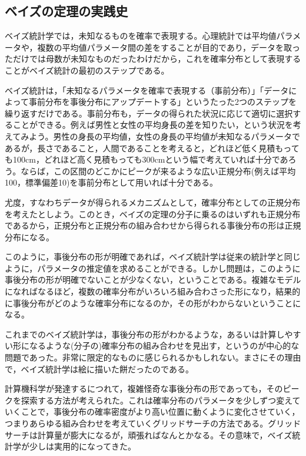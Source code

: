 \documentclass[
  a4paper,
]{ltjsbook}
\begin{document}
\subsection{ベイズの定理の実践史}\label{ux30d9ux30a4ux30baux306eux5b9aux7406ux306eux5b9fux8df5ux53f2}

ベイズ統計学では，未知なるものを確率で表現する。心理統計では平均値パラメータや，複数の平均値パラメータ間の差をすることが目的であり，データを取っただけでは母数が未知なものだったわけだから，これを確率分布として表現することがベイズ統計の最初のステップである。

ベイズ統計は，「未知なるパラメータを確率で表現する（事前分布）」「データによって事前分布を事後分布にアップデートする」というたった2つのステップを繰り返すだけである。事前分布も，データの得られた状況に応じて適切に選択することができる。例えば男性と女性の平均身長の差を知りたい，という状況を考えてみよう。男性の身長の平均値，女性の身長の平均値が未知なるパラメータであるが，長さであること，人間であることを考えると，どれほど低く見積もっても100cm，どれほど高く見積もっても300cmという幅で考えていれば十分であろう。ならば，この区間のどこかにピークが来るような広い正規分布(例えば平均100，標準偏差10)を事前分布として用いれば十分である。

尤度，すなわちデータが得られるメカニズムとして，確率分布としての正規分布を考えたとしよう。このとき，ベイズの定理の分子に乗るのはいずれも正規分布であるから，正規分布と正規分布の組み合わせから得られる事後分布の形は正規分布になる。

このように，事後分布の形が明確であれば，ベイズ統計学は従来の統計学と同じように，パラメータの推定値を求めることができる。しかし問題は，このように事後分布の形が明確でないことが少なくない，ということである。複雑なモデルになればなるほど，複数の確率分布がいろいろ組み合わさった形になり，結果的に事後分布がどのような確率分布になるのか，その形がわからないということになる。

これまでのベイズ統計学は，事後分布の形がわかるような，あるいは計算しやすい形になるような(分子の)確率分布の組み合わせを見出す，というのが中心的な問題であった。非常に限定的なものに感じられるかもしれない。まさにその理由で，ベイズ統計学は絵に描いた餅だったのである。

計算機科学が発達するにつれて，複雑怪奇な事後分布の形であっても，そのピークを探索する方法が考えられた。これは確率分布のパラメータを少しずつ変えていくことで，事後分布の確率密度がより高い位置に動くように変化させていく，つまりあらゆる組み合わせを考えていくグリッドサーチの方法である。グリッドサーチは計算量が膨大になるが，頑張ればなんとかなる。その意味で，ベイズ統計学が少しは実用的になってきた。
\end{document}
